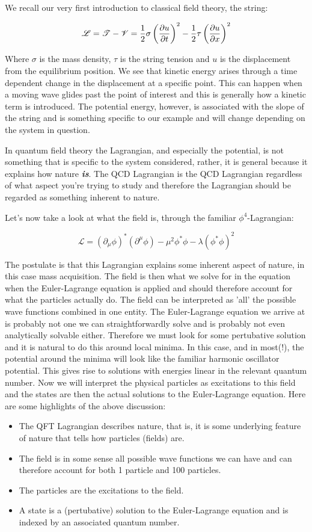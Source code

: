 \documentclass[a4,10pt,titlepage]{article}
\renewcommand\[{\begin{equation*}}
\renewcommand\]{\end{equation*}}
\newcommand{\be}{\begin{equation}}
\newcommand{\ee}{\end{equation}}
\numberwithin{equation}{section}
\newcommand{\lp}{\left}
\newcommand{\rp}{\right}
\newcommand{\Lar}{\mathscr{L}}
\newcommand{\half}{\frac{1}{2}}
\begin{document}
We recall our very first introduction to classical field theory, the string:

\be
\Lar = \mathscr{T}-\mathscr{V} = \half\sigma \lp(\pdv{u}{t}\rp)^2-\half\tau\lp(\pdv{u}{x}\rp)^2
\ee

Where $\sigma$ is the mass density, $\tau$ is the string tension and $u$ is the displacement from the equilibrium position. We see that kinetic energy arises through a time dependent change in the displacement at a specific point. This can happen when a moving wave glides past the point of interest and this is generally how a kinetic term is introduced. The potential energy, however, is associated with the slope of the string and is something specific to our example and will change depending on the system in question. 

In quantum field theory the Lagrangian, and especially the potential, is not something that is specific to the system considered, rather, it is general because it explains how nature \textbf{\textit{is}}. The QCD Lagrangian is the QCD Lagrangian regardless of what aspect you're trying to study and therefore the Lagrangian should be regarded as something inherent to nature. 

Let's now take a look at what the field is, through the familiar $\phi^4$-Lagrangian:

\be
\Lar=\lp(\partial_\mu\phi\rp)^*\lp(\partial^\mu\phi\rp)-\mu^2\phi^*\phi-\lambda\lp(\phi^*\phi \rp)^2
\ee

The postulate is that this Lagrangian explains some inherent aspect of nature, in this case mass acquisition. The field is then what we solve for in the equation when the Euler-Lagrange equation is applied and should therefore account for what the particles actually do. The field can be interpreted as 'all' the possible wave functions combined in one entity. The Euler-Lagrange equation we arrive at is probably not one we can straightforwardly solve and is probably not even analytically solvable either. Therefore we must look for some pertubative solution and it is natural to do this around local minima. In this case, and in most(!), the potential around the minima will look like the familiar harmonic oscillator potential. This gives rise to solutions with energies linear in the relevant quantum number. Now we will interpret the physical particles as excitations to this field and the states are then the actual solutions to the Euler-Lagrange equation. Here are some highlights of the above discussion: 
\begin{itemize}
    \item The QFT Lagrangian describes nature, that is, it is some underlying feature of nature that tells how particles (fields) are.
    \item The field is in some sense all possible wave functions we can have and can therefore account for both 1 particle and 100 particles. 
    \item The particles are the excitations to the field.
    \item A state is a (pertubative) solution to the Euler-Lagrange equation and is indexed by an associated quantum number.
\end{itemize}
\end{document}

